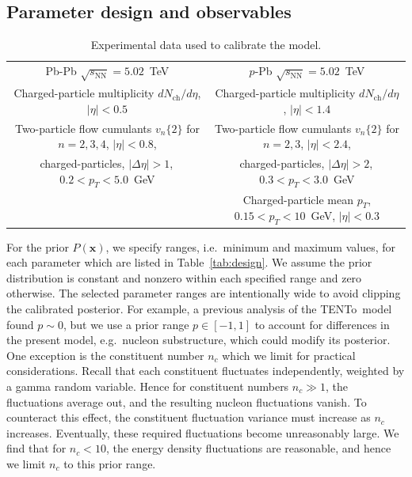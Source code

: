 \documentclass[aps,prc,reprint,amsmath,nofootinbib]{revtex4-1}
\newcommand{\trento}{T\raisebox{-0.5ex}{R}ENTo}
\newcommand{\sqrts}{\sqrt{s_\mathrm{NN}}}
\newcommand{\nch}{N_\text{ch}}
\newcommand{\vnk}[2]{v_#1\{#2\}}
\newcommand{\nc}{n_c}
\newcommand{\xv}{\mathbf x}
\newcommand{\paddedhline}{\noalign{\smallskip}\hline\noalign{\smallskip}}
\begin{document}
\subsection{Parameter design and observables}
\label{sec:observables}

\begin{table}
  \caption{
    \label{tab:observables}
    Experimental data used to calibrate the model.
  }
  \begin{ruledtabular}
  \begin{tabular}{cc}
    Pb-Pb $\sqrts=5.02$~TeV & $p$-Pb $\sqrts=5.02$~TeV \\
    \paddedhline
    Charged-particle multiplicity $d\nch/d\eta$, $|\eta| < 0.5$ \cite{Adam:2015ptt} & Charged-particle multiplicity $d\nch/d\eta$, $|\eta| < 1.4$ \cite{Adam:2014qja} \\
    \noalign{\smallskip}
    Two-particle flow cumulants  $\vnk{n}{2}$ for $n=2,3,4$, $|\eta| < 0.8$,  & Two-particle flow cumulants $\vnk{n}{2}$ for $n=2,3$, $|\eta| < 2.4$, \\
    charged-particles, $|\Delta\eta| > 1$,\, $0.2 < p_T < 5.0$~GeV \cite{Adam:2016izf} & charged-particles, $|\Delta\eta| > 2$,\, $0.3 < p_T < 3.0$~GeV \cite{Chatrchyan:2013nka}\\
    \noalign{\smallskip}
    & Charged-particle mean $p_T$, $0.15 < p_T < 10$~GeV, $|\eta| < 0.3$ \cite{Abelev:2013bla}\\
  \end{tabular}
  \end{ruledtabular}
\end{table}

For the prior $P(\xv)$, we specify ranges, i.e.\ minimum and maximum values, for each parameter which are listed in Table~\ref{tab:design}.
We assume the prior distribution is constant and nonzero within each specified range and zero otherwise.
The selected parameter ranges are intentionally wide to avoid clipping the calibrated posterior.
For example, a previous analysis of the \trento\ model \cite{Bernhard:2016tnd} found $p \sim 0$, but we use a prior range $p \in [-1, 1]$ to account for differences in the present model, e.g.\ nucleon substructure, which could modify its posterior.
One exception is the constituent number $\nc$ which we limit for practical considerations.
Recall that each constituent fluctuates independently, weighted by a gamma random variable.
Hence for constituent numbers $\nc \gg 1$, the fluctuations average out, and the resulting nucleon fluctuations vanish.
To counteract this effect, the constituent fluctuation variance must increase as $\nc$ increases.
Eventually, these required fluctuations become unreasonably large.
We find that for $\nc < 10$, the energy density fluctuations are reasonable, and hence we limit $\nc$ to this prior range.
\end{document}

